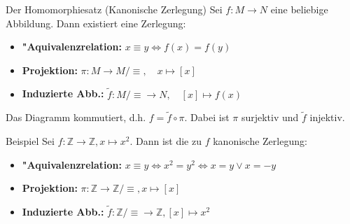 \documentclass{beamer}
\begin{document}
\begin{frame}{Der Homomorphiesatz (Kanonische Zerlegung)}
    Sei $f: M \to N$ eine beliebige Abbildung. Dann existiert eine Zerlegung:
    
    \vspace{0.5cm}
    
    \begin{itemize}
        \item \textbf{"Aquivalenzrelation:} $x \equiv y \iff f(x) = f(y)$
        \item \textbf{Projektion:} $\pi: M \to M/{\equiv}, \quad x \mapsto [x]$
        \item \textbf{Induzierte Abb.:} $\tilde{f}: M/{\equiv} \to N, \quad [x] \mapsto f(x)$
    \end{itemize}

    \vspace{0.5cm}
    
    Das Diagramm kommutiert, d.h. $f = \tilde{f} \circ \pi$. 
    Dabei ist $\pi$ surjektiv und $\tilde{f}$ injektiv.
\end{frame}

\begin{frame}{Beispiel}
  Sei $f:\mathbb{Z}\to\mathbb{Z}, x\mapsto x^2$. Dann ist die zu $f$ kanonische Zerlegung:
  \begin{itemize}
    \item \textbf{"Aquivalenzrelation:} $x\equiv y\iff x^2=y^2\iff x=y\vee x=-y$
    \item \textbf{Projektion:} $\pi:\mathbb{Z}\to\mathbb{Z}/\equiv, x\mapsto [x]$
    \item \textbf{Induzierte Abb.:} $\tilde{f}:\mathbb{Z}/\equiv\to\mathbb{Z}, [x]\mapsto x^2$
  \end{itemize}
\end{frame}

\end{document}
